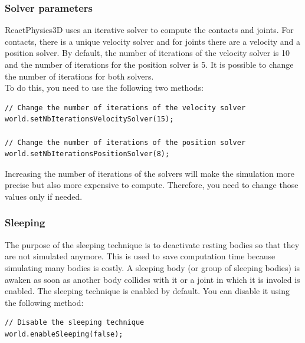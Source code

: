 \documentclass[a4paper,12pt]{article}
\begin{document}
    \subsubsection{Solver parameters}

    ReactPhysics3D uses an iterative solver to compute the contacts and joints. For contacts, there is a unique velocity solver and for joints there are a velocity and a
    position solver. By default, the number of iterations of the velocity solver is 10 and the number of iterations for the position solver is 5. It is possible to
    change the number of iterations for both solvers. \\

    To do this, you need to use the following two methods: \\

    \begin{lstlisting}
// Change the number of iterations of the velocity solver
world.setNbIterationsVelocitySolver(15);

// Change the number of iterations of the position solver
world.setNbIterationsPositionSolver(8);
  \end{lstlisting}

    \vspace{0.6cm}

    Increasing the number of iterations of the solvers will make the simulation more precise but also more expensive to compute. Therefore, you need to change
    those values only if needed.

    \subsubsection{Sleeping}
    \label{sec:sleeping}

    The purpose of the sleeping technique is to deactivate resting bodies so that they are not simulated anymore. This is used to save computation time because simulating
    many bodies is costly.
    A sleeping body (or group of sleeping bodies) is awaken as soon as another body collides with it or a joint in which it is involed is enabled. The sleeping technique
    is enabled by default. You can disable it using the following method: \\

    \begin{lstlisting}
// Disable the sleeping technique
world.enableSleeping(false);
  \end{lstlisting}

    \vspace{0.6cm}
\end{document}
